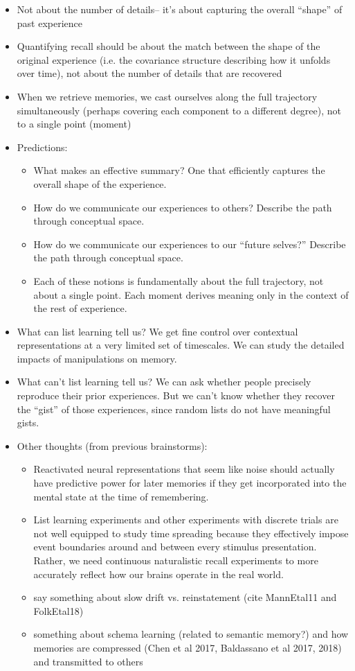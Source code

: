 \documentclass{article}
\begin{document}
\begin{itemize}
\item Not about the number of details-- it's about capturing the overall ``shape'' of past experience
\item Quantifying recall should be about the match between the shape of the original experience (i.e. the covariance structure describing how it unfolds over time), not about the number of details that are recovered
\item When we retrieve memories, we cast ourselves along the full trajectory simultaneously (perhaps covering each component to a different degree), not to a single point (moment)
\item Predictions:
\begin{itemize}
    \item What makes an effective summary?  One that efficiently captures the overall shape of the experience.
    \item How do we communicate our experiences to others?  Describe the path through conceptual space.
    \item How do we communicate our experiences to our ``future selves?''  Describe the path through conceptual space.
    \item Each of these notions is fundamentally about the full trajectory, not about a single point.  Each moment derives meaning only in the context of the rest of experience.
\end{itemize}
\item What can list learning tell us?  We get fine control over  contextual representations at a very limited set of timescales.  We can study the detailed impacts of manipulations on memory.
\item What can't list learning tell us?  We can ask whether people precisely reproduce their prior experiences.  But we can't know whether they recover the ``gist'' of those experiences, since random lists do not have meaningful gists.
\item Other thoughts (from previous brainstorms):
    \begin{itemize}
    \item Reactivated neural representations that seem like noise should actually have predictive power for later memories if they get incorporated into the mental state at the time of remembering.
    \item List learning experiments and other experiments with discrete trials are not well equipped to study time spreading because they effectively impose event boundaries around and between every stimulus presentation.  Rather, we need continuous naturalistic recall experiments to more accurately reflect how our brains operate in the real world.
    \item say something about slow drift vs. reinstatement (cite MannEtal11 and FolkEtal18)
    \item something about schema learning (related to semantic memory?) and how memories are compressed (Chen et al 2017, Baldassano et al 2017, 2018) and transmitted to others
    \end{itemize}
\end{itemize}
\end{document}
